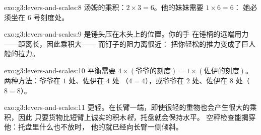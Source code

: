 \begin{solution}{exo:g3:levers-and-scales:8}
汤姆的乘积：$2 \times 3 = 6$。他的妹妹需要 $1 \times 6 = 6$：
她必须坐在 $6$ 号刻度处。
\end{solution}

\begin{solution}{exo:g3:levers-and-scales:9}
是锤头压在木头上的位置。你的手
在锤柄的远端用力——距离长，因此乘积大——
而钉子的阻力离很近：
把你轻松的推力变成了巨人般的拉力。
\end{solution}

\begin{solution}{exo:g3:levers-and-scales:10}
平衡需要 $4 \times (\text{爷爷的刻度}) = 1 \times
(\text{佐伊的刻度})$。两种方法：爷爷在 $1$ 处、佐伊在 $4$ 处
（$4 = 4$），或爷爷在 $2$ 处、佐伊在 $8$ 处（$8 = 8$）。
\end{solution}

\begin{solution}{exo:g3:levers-and-scales:11}
更轻。在长臂一端，即使很轻的重物也会产生很大的乘积，因此
只要货物比短臂上诚实的积木\emph{轻}，托盘就会保持水平。
空秤检查能揭穿他：托盘里什么也不放时，
他的就已经向长臂一侧倾斜。
\end{solution}
